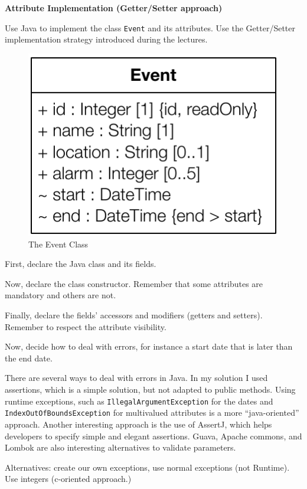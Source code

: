\documentclass[a4paper,11pt]{memoir}
\newcommand{\code}[1]{\lstinline{#1}}
\begin{document}
\begin{question}
	\textbf{Attribute Implementation (Getter/Setter approach)} 
	
Use Java to implement the class \code{Event} and its attributes. 
Use the Getter/Setter implementation strategy introduced during the lectures.  


\begin{figure}[htbp]
	\centering
		\includegraphics[width=.4\linewidth]{CD-Event.pdf}
	\caption{The Event Class}
	\label{fig:event}
\end{figure}	

\begin{inparaenum}[(A)]
	\item First, declare the Java class and its fields.
	\item Now, declare the class constructor. Remember that some attributes are mandatory and others are not.
	\item Finally, declare the fields' accessors and modifiers (getters and setters). Remember to respect the attribute visibility.
	\item Now, decide how to deal with errors, for instance a start date that is later than the end date. 
\end{inparaenum}
\end{question}

\begin{solution}
			There are several ways to deal with errors in Java. In my solution I used assertions, which is a simple solution, but not adapted to public methods. Using runtime exceptions, such as \code{IllegalArgumentException} for the dates and \code{IndexOutOfBoundsException} for multivalued attributes is a more ``java-oriented'' approach. Another interesting approach is the use of AssertJ, which helps developers to specify simple and elegant assertions. Guava, Apache commons, and Lombok are also interesting alternatives to validate parameters.
			
			Alternatives: create our own exceptions, use normal exceptions (not Runtime). Use integers (c-oriented approach.)



\end{solution}
	
\end{document}
